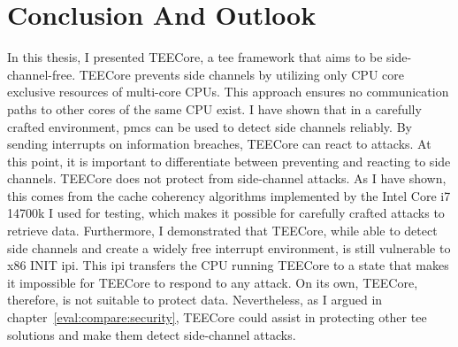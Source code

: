\chapter{Conclusion And Outlook}
\label{sec:conclusion}



In this thesis, I presented TEECore, a \gls{tee} framework that aims to be
side-channel-free. TEECore prevents side channels by utilizing only CPU core
exclusive resources of multi-core CPUs. This approach ensures no communication
paths to other cores of the same CPU exist. I have shown that in a carefully
crafted environment, \glspl{pmc} can be used to detect side channels reliably.
By sending interrupts on information breaches, TEECore can react to attacks. At
this point, it is important to differentiate between preventing and reacting to
side channels. TEECore does not protect from side-channel attacks. As I have
shown, this comes from the cache coherency algorithms implemented by the Intel
Core i7 14700k I used for testing, which makes it possible for carefully crafted
attacks to retrieve data. Furthermore, I demonstrated that TEECore, while able
to detect side channels and create a widely free interrupt environment, is still
vulnerable to x86 INIT \gls{ipi}. This \gls{ipi} transfers the CPU running
TEECore to a state that makes it impossible for TEECore to respond to any
attack. On its own, TEECore, therefore, is not suitable to protect data.
Nevertheless, as I argued in chapter~\ref{eval:compare:security}, TEECore could
assist in protecting other \gls{tee} solutions and make them detect side-channel
attacks.

\cleardoublepage

